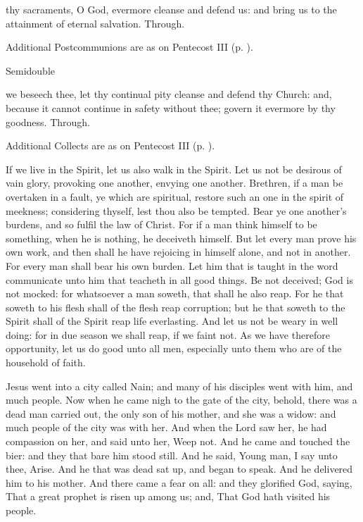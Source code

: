 \postcommunion
{} thy sacraments, O God, evermore cleanse and defend us: and bring us to the attainment of eternal salvation. Through.
\begin{rubric}
    Additional Postcommunions are as on Pentecost III (p. \pageref{PentecostIII}).
\end{rubric}

\begin{inhead}
{Semidouble}
\end{inhead}

\collect
{} we beseech thee, let thy continual pity cleanse and defend thy Church: and, because it cannot continue in safety without thee; govern it evermore by thy goodness. Through.
\begin{rubric}
    Additional Collects are as on Pentecost III (p. \pageref{PentecostIII}).
\end{rubric}

 If we live in the Spirit, let us also walk in the Spirit. Let us not be desirous of vain glory, provoking one another, envying one another. Brethren, if a man be overtaken in a fault, ye which are spiritual, restore such an one in the spirit of meekness; considering thyself, lest thou also be tempted. Bear ye one another's burdens, and so fulfil the law of Christ. For if a man think himself to be something, when he is nothing, he deceiveth himself. But let every man prove his own work, and then shall he have rejoicing in himself alone, and not in another. For every man shall bear his own burden. Let him that is taught in the word communicate unto him that teacheth in all good things. Be not deceived; God is not mocked: for whatsoever a man soweth, that shall he also reap. For he that soweth to his flesh shall of the flesh reap corruption; but he that soweth to the Spirit shall of the Spirit reap life everlasting. And let us not be weary in well doing: for in due season we shall reap, if we faint not. As we have therefore opportunity, let us do good unto all men, especially unto them who are of the household of faith.

 Jesus went into a city called Nain; and many of his disciples went with him, and much people. Now when he came nigh to the gate of the city, behold, there was a dead man carried out, the only son of his mother, and she was a widow: and much people of the city was with her. And when the Lord saw her, he had compassion on her, and said unto her, Weep not. And he came and touched the bier: and they that bare him stood still. And he said, Young man, I say unto thee, Arise. And he that was dead sat up, and began to speak. And he delivered him to his mother. And there came a fear on all: and they glorified God, saying, That a great prophet is risen up among us; and, That God hath visited his people.

